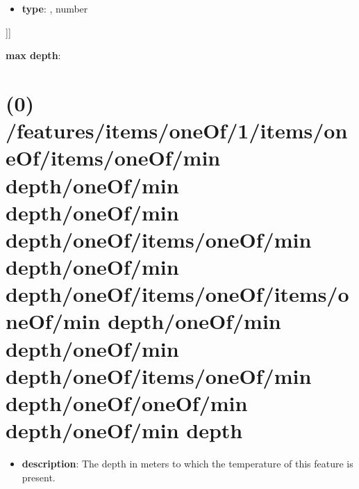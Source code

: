 \begin{itemize}[leftmargin=5em]\item {\bf type}: , number\end{itemize}]]\item {\bf max depth}: \section{(0) /features/items/oneOf/1/items/oneOf/items/oneOf/min depth/oneOf/min depth/oneOf/min depth/oneOf/items/oneOf/min depth/oneOf/min depth/oneOf/items/oneOf/items/oneOf/min depth/oneOf/min depth/oneOf/min depth/oneOf/items/oneOf/min depth/oneOf/oneOf/min depth/oneOf/min depth}
\begin{itemize}[leftmargin=0em]\item {\bf description}: The depth in meters to which the temperature of this feature is present.
\end{itemize}
